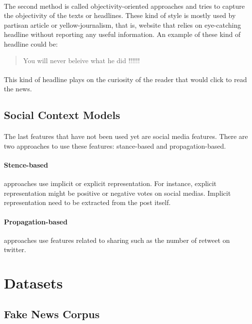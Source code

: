 \paragraph{}The second method is called objectivity-oriented approaches and tries to capture the objectivity of the texts or headlines. These kind of style is mostly used by partisan article or yellow-journalism, that is, website that relies on eye-catching headline without reporting any useful information. An example of these kind of headline could be:
	\begin{quote}You will never beleive what he did !!!!!!\end{quote}
\paragraph{} This kind of headline plays on the curiosity of the reader that would click to read the news.

\subsection{Social Context Models}
\paragraph{} The last features that have not been used yet are social media features. There are two approaches to use these features: stance-based and propagation-based. 

\paragraph{Stence-based} approaches use implicit or explicit representation. For instance, explicit representation might be positive or negative votes on social medias. Implicit representation need to be extracted from the post itself. 

\paragraph{Propagation-based} approaches use features related to sharing such as the number of retweet on twitter. 

\section{Datasets} \label{intro:dataset}
\subsection{Fake News Corpus}
